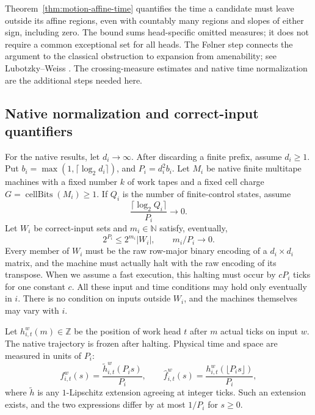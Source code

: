 Theorem~\ref{thm:motion-affine-time} quantifies the time a candidate must
leave outside its affine regions, even with countably many regions and
slopes of either sign, including zero.  The bound sums head-specific omitted
measures; it does not require a common exceptional set for all heads.
The F\o lner step connects the argument to the classical obstruction to
expansion from amenability; see Lubotzky--Weiss \cite{LubotzkyWeiss1993}.
The crossing-measure estimates and native time normalization are the
additional steps needed here.

\subsection{Native normalization and correct-input quantifiers}

For the native results, let $d_i\to\infty$. After discarding a finite prefix,
assume $d_i\ge1$. Put
$b_i=\max(1,\lceil\log_2 d_i\rceil)$, and $P_i=d_i^2b_i$.  Let $M_i$ be
native finite multitape machines with a fixed number $k$ of work tapes and a
fixed cell charge $G=\operatorname{cellBits}(M_i)\ge1$.  If $Q_i$ is the number
of finite-control states, assume
\begin{equation}
\label{eq:motion-control}
  \frac{\lceil\log_2 Q_i\rceil}{P_i}\longrightarrow0.
\end{equation}
Let $W_i$ be correct-input sets and $m_i\in\mathbb N$ satisfy, eventually,
\begin{equation}
\label{eq:motion-entropy}
  2^{P_i}\le 2^{m_i}|W_i|,\qquad m_i/P_i\longrightarrow0.
\end{equation}
Every member of $W_i$ must be the raw row-major binary encoding of a
$d_i\times d_i$ matrix, and the machine must actually halt with the raw
encoding of its transpose.  When we assume a fast execution, this halting
must occur by $cP_i$ ticks for one constant $c$.  All these input and time
conditions may hold only eventually in $i$.  There is no condition on inputs
outside $W_i$, and the machines themselves may vary with $i$.

Let $h_{i,t}^{w}(m)\in\mathbb Z$ be the position of work head $t$ after $m$
actual ticks on input $w$.  The native trajectory is frozen after halting.
Physical time and space are measured in units of $P_i$:
\begin{equation}
\label{eq:motion-physical}
  f_{i,t}^{w}(s)=\frac{\widetilde h_{i,t}^{w}(P_i s)}{P_i},
  \qquad
  \widehat f_{i,t}^{w}(s)=\frac{h_{i,t}^{w}(\lfloor P_i s\rfloor)}{P_i},
\end{equation}
where $\widetilde h$ is any $1$-Lipschitz extension agreeing at integer ticks.
Such an extension exists, and the two expressions differ by at most $1/P_i$
for $s\ge0$.

